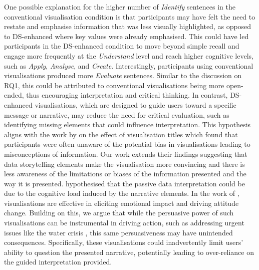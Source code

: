 One possible explanation for the higher number of \textit{Identify} sentences in the conventional visualisation condition is that participants may have felt the need to restate and emphasise information that was less visually highlighted, as opposed to DS-enhanced where key values were already emphasised. This could have led participants in the DS-enhanced condition to move beyond simple recall and engage more frequently at the \textit{Understand} level and reach higher cognitive levels, such as \textit{Apply}, \textit{Analyse}, and \textit{Create}. Interestingly, participants using conventional visualisations produced more \textit{Evaluate} sentences. Similar to the discussion on RQ1, this could be attributed to conventional visualisations being more open-ended, thus encouraging interpretation and critical thinking. In contrast, DS-enhanced visualisations, which are designed to guide users toward a specific message or narrative, may reduce the need for critical evaluation, such as identifying missing elements that could influence interpretation. This hypothesis aligns with the work by \citet{kong2018} on the effect of visualisation titles which found that participants were often unaware of the potential bias in visualisations leading to misconceptions of information. Our work extends their findings suggesting that data storytelling elements make the visualisation more convincing and there is less awareness of the limitations or biases of the information presented and the way it is presented. \citet{rogha2024impact} hypothesised that the passive data interpretation could be due to the cognitive load induced by the narrative elements.  In the work of \citet{garreton2024attitudinal}, visualisations are effective in eliciting emotional impact and driving attitude change. Building on this, we argue that while the persuasive power of such visualisations can be instrumental in driving action, such as addressing urgent issues like the water crisis \cite{garreton2024attitudinal}, this same persuasiveness may have unintended consequences. Specifically, these visualisations could inadvertently limit users’ ability to question the presented narrative, potentially leading to over-reliance on the guided interpretation provided.  


